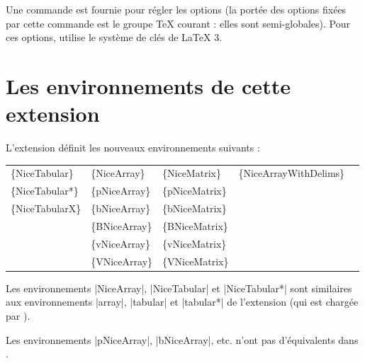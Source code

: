 \documentclass[dvipsnames]{article}
\begin{document}
\smallskip
{}
Une commande  est fournie pour régler les
options (la portée des options fixées par cette commande est le groupe TeX
courant : elles sont semi-globales). Pour ces options,  utilise
le système de clés  de LaTeX 3.



\newpage

\tableofcontents



\newpage

\section{Les environnements de cette extension}




L'extension  définit les nouveaux environnements suivants :

\medskip
\begin{ttfamily}
\setlength{\tabcolsep}{3mm}
\begin{tabular}{lllll}
\{NiceTabular\}  & \{NiceArray\}  & \{NiceMatrix\}  & \{NiceArrayWithDelims\} \\
\{NiceTabular*\} & \{pNiceArray\} & \{pNiceMatrix\}  \\
\{NiceTabularX\} & \{bNiceArray\} & \{bNiceMatrix\}  \\
                 & \{BNiceArray\} & \{BNiceMatrix\}  \\
                 & \{vNiceArray\} & \{vNiceMatrix\}  \\
                 & \{VNiceArray\} & \{VNiceMatrix\}
\end{tabular}
\end{ttfamily}


\medskip
Les environnements |{NiceArray}|, |{NiceTabular}| et |{NiceTabular*}| sont
similaires aux environnements |{array}|, |{tabular}| et |{tabular*}| de
l'extension  (qui est chargée par ).


\medskip
Les environnements |{pNiceArray}|, |{bNiceArray}|, etc. n'ont pas d'équivalents
dans .
\end{document}

